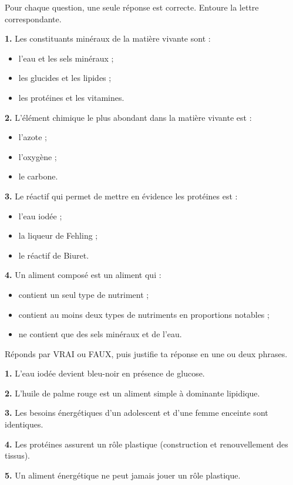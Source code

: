 \documentclass[11pt]{article}
\begin{document}
\begin{exercice}
Pour chaque question, une seule réponse est correcte. Entoure la lettre correspondante.

\textbf{1.} Les constituants minéraux de la matière vivante sont :
\begin{itemize}
\item[a)] l'eau et les sels minéraux ;
\item[b)] les glucides et les lipides ;
\item[c)] les protéines et les vitamines.
\end{itemize}

\textbf{2.} L'élément chimique le plus abondant dans la matière vivante est :
\begin{itemize}
\item[a)] l'azote ;
\item[b)] l'oxygène ;
\item[c)] le carbone.
\end{itemize}

\textbf{3.} Le réactif qui permet de mettre en évidence les protéines est :
\begin{itemize}
\item[a)] l'eau iodée ;
\item[b)] la liqueur de Fehling ;
\item[c)] le réactif de Biuret.
\end{itemize}

\textbf{4.} Un aliment composé est un aliment qui :
\begin{itemize}
\item[a)] contient un seul type de nutriment ;
\item[b)] contient au moins deux types de nutriments en proportions notables ;
\item[c)] ne contient que des sels minéraux et de l'eau.
\end{itemize}
\end{exercice}

\begin{exercice}
Réponds par VRAI ou FAUX, puis justifie ta réponse en une ou deux phrases.

\textbf{1.} L'eau iodée devient bleu-noir en présence de glucose.

\textbf{2.} L'huile de palme rouge est un aliment simple à dominante lipidique.

\textbf{3.} Les besoins énergétiques d'un adolescent et d'une femme enceinte sont identiques.

\textbf{4.} Les protéines assurent un rôle plastique (construction et renouvellement des tissus).

\textbf{5.} Un aliment énergétique ne peut jamais jouer un rôle plastique.
\end{exercice}
\end{document}
